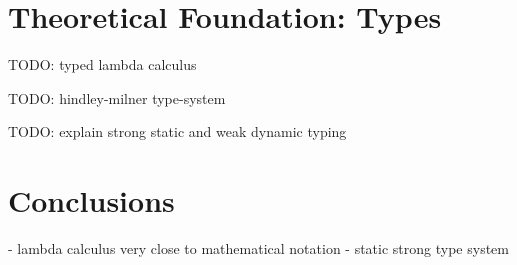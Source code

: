 \section{Theoretical Foundation: Types}
TODO: typed lambda calculus

TODO: hindley-milner type-system

TODO: explain strong static and weak dynamic typing

\section{Conclusions}
- lambda calculus very close to mathematical notation
- static strong type system 